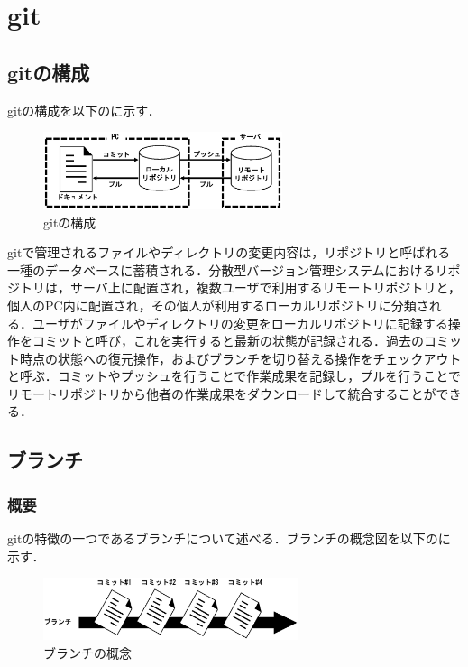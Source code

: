 \documentclass[a4paper,9pt,twocolumn]{jsarticle}
\begin{document}
\section{git}
\subsection{gitの構成}
gitの構成を以下のに示す．

\begin{figure}[h]
\centering
\includegraphics[width=70mm]{img/git.eps}
\caption{gitの構成}
\label{git}
\end{figure}

gitで管理されるファイルやディレクトリの変更内容は，リポジトリと呼ばれる一種のデータベースに蓄積される．分散型バージョン管理システムにおけるリポジトリは，サーバ上に配置され，複数ユーザで利用するリモートリポジトリと，個人のPC内に配置され，その個人が利用するローカルリポジトリに分類される．ユーザがファイルやディレクトリの変更をローカルリポジトリに記録する操作をコミットと呼び，これを実行すると最新の状態が記録される．過去のコミット時点の状態への復元操作，およびブランチを切り替える操作をチェックアウトと呼ぶ．コミットやプッシュを行うことで作業成果を記録し，プルを行うことでリモートリポジトリから他者の作業成果をダウンロードして統合することができる．

\subsection{ブランチ}
\subsubsection{概要}
gitの特徴の一つであるブランチについて述べる．ブランチの概念図を以下のに示す．

\begin{figure}[h]
\centering
\includegraphics[width=75mm]{img/branch1.eps}
\caption{ブランチの概念}
\label{branch}
\end{figure}
\end{document}
